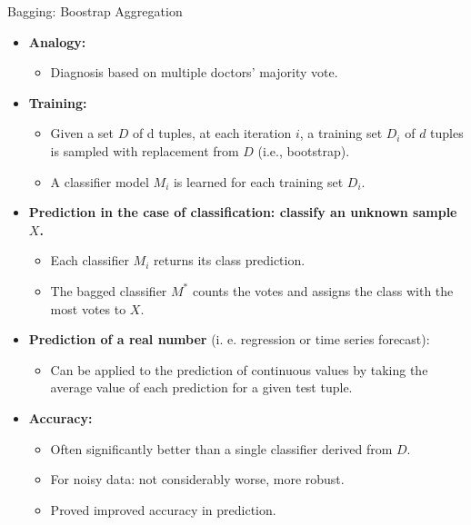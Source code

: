 \begin{frame}{Bagging: Boostrap Aggregation}
	\begin{itemize}
		\item \textbf{Analogy:}
		      \begin{itemize}
			      \item Diagnosis based on multiple doctors' majority vote.
		      \end{itemize}
		\item \textbf{Training:}
		      \begin{itemize}
			      \item Given a set $D$ of d tuples, at each iteration $i$, a training set $D_i$ of $d$ tuples is sampled with replacement from $D$ (i.e., bootstrap).
			      \item A classifier model $M_i$ is learned for each training set $D_i$.
		      \end{itemize}
		\item \textbf{Prediction in the case of classification: classify an unknown sample $X$.}
		      \begin{itemize}
			      \item Each classifier $M_i$ returns its class prediction.
			      \item The bagged classifier $M^*$ counts the votes and assigns the class with the most votes to $X$.
		      \end{itemize}
		\item \textbf{Prediction of a real number} (i. e. regression or time series forecast):
		      \begin{itemize}
			      \item Can be applied to the prediction of continuous values by taking the average value of each prediction for a given test tuple.
		      \end{itemize}
		\item \textbf{Accuracy:}
		      \begin{itemize}
			      \item Often significantly better than a single classifier derived from $D$.
			      \item For noisy data: not considerably worse, more robust.
			      \item Proved improved accuracy in prediction.
		      \end{itemize}
	\end{itemize}
\end{frame}


